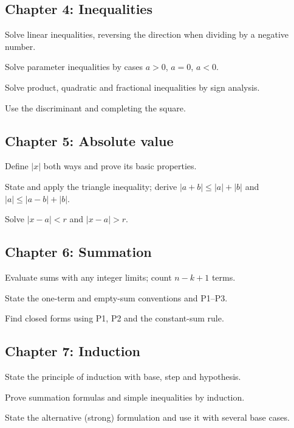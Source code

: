 \subsection*{Chapter 4: Inequalities}
\begin{checklist}
  \item Solve linear inequalities, reversing the direction when dividing by a negative number.
  \item Solve parameter inequalities by cases $a>0$, $a=0$, $a<0$.
  \item Solve product, quadratic and fractional inequalities by sign analysis.
  \item Use the discriminant and completing the square.
\end{checklist}
\subsection*{Chapter 5: Absolute value}
\begin{checklist}
  \item Define $|x|$ both ways and prove its basic properties.
  \item State and apply the triangle inequality; derive $|a+b|\le|a|+|b|$ and $|a|\le|a-b|+|b|$.
  \item Solve $|x-a|<r$ and $|x-a|>r$.
\end{checklist}
\subsection*{Chapter 6: Summation}
\begin{checklist}
  \item Evaluate sums with any integer limits; count $n-k+1$ terms.
  \item State the one-term and empty-sum conventions and P1--P3.
  \item Find closed forms using P1, P2 and the constant-sum rule.
\end{checklist}
\subsection*{Chapter 7: Induction}
\begin{checklist}
  \item State the principle of induction with base, step and hypothesis.
  \item Prove summation formulas and simple inequalities by induction.
  \item State the alternative (strong) formulation and use it with several base cases.
\end{checklist}
